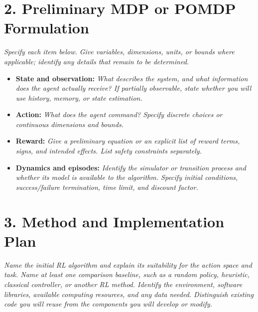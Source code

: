 \documentclass[11pt,letterpaper]{article}
\newcommand{\prompt}[1]{{\itshape #1}}
\begin{document}
\section*{2. Preliminary MDP or POMDP Formulation}
\prompt{Specify each item below. Give variables, dimensions, units, or bounds
where applicable; identify any details that remain to be determined.}
\begin{itemize}
  \item \textbf{State and observation:} \prompt{What describes the system, and
  what information does the agent actually receive? If partially observable,
  state whether you will use history, memory, or state estimation.}
  \item \textbf{Action:} \prompt{What does the agent command? Specify discrete
  choices or continuous dimensions and bounds.}
  \item \textbf{Reward:} \prompt{Give a preliminary equation or an explicit list
  of reward terms, signs, and intended effects. List safety constraints separately.}
  \item \textbf{Dynamics and episodes:} \prompt{Identify the simulator or transition
  process and whether its model is available to the algorithm. Specify initial
  conditions, success/failure termination, time limit, and discount factor.}
\end{itemize}

\section*{3. Method and Implementation Plan}
\prompt{Name the initial RL algorithm and explain its suitability for the action
space and task. Name at least one comparison baseline, such as a random policy,
heuristic, classical controller, or another RL method. Identify the environment,
software libraries, available computing resources, and any data needed. Distinguish
existing code you will reuse from the components you will develop or modify.}
\end{document}
